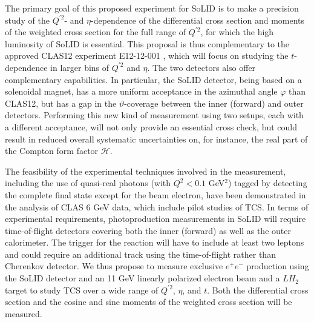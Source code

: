 The primary goal of this proposed experiment for SoLID is to make a precision
study of the $Q^{\prime 2}$- and $\eta$-dependence of the differential cross
section and moments of the weighted cross section for the full range of
$Q^{\prime 2}$, for which the high luminosity of SoLID is essential. This
proposal is thus complementary to the approved CLAS12 experiment E12-12-001
\cite{E12-12-001}, which will focus on studying the $t$-dependence in larger
bins of $Q^{\prime 2}$ and $\eta$.
The two detectors also offer complementary capabilities. In particular, the
SoLID detector, being based on a solenoidal magnet, has a more uniform
acceptance in the azimuthal angle $\varphi$ than CLAS12, but has a gap in
the $\vartheta$-coverage between the inner (forward) and outer detectors.
Performing this new kind of measurement using two setups, each with a
different acceptance, will not only provide an essential cross check, but
could result in reduced overall systematic uncertainties on, for instance,
the real part of the Compton form factor $\mathcal{H}$.

The feasibility of the experimental techniques involved in the measurement,
including the use of quasi-real photons (with $Q^2 < 0.1$ GeV$^2$) tagged by
detecting the complete final state except for the beam electron, have been
demonstrated in the analysis of CLAS 6 GeV data, which include pilot studies
of TCS. In terms of experimental requirements, photoproduction measurements in
SoLID will require time-of-flight detectors covering both the inner (forward)
as well as the outer calorimeter. The trigger for the reaction will have to
include at least two leptons and could require an additional track using the
time-of-flight rather than Cherenkov detector.
We thus propose to measure exclusive $e^+e^-$ production using the SoLID
detector and an 11 GeV linearly polarized electron beam and a $LH_2$ target
to study TCS over a wide range of $Q^{\prime 2}$, $\eta$, and $t$. Both the
differential cross section and the cosine and sine moments of the weighted
cross section will be measured.

